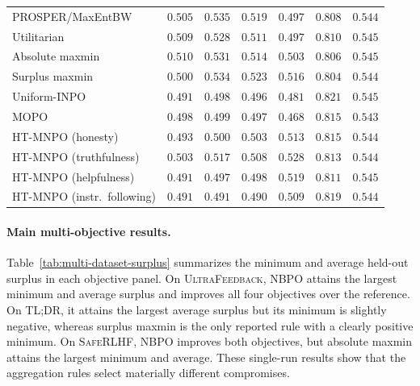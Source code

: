 \documentclass{article}
\theoremstyle{remark}
\theoremstyle{plain}
\newcommand{\NBPO}{\textsc{NBPO}}
\begin{document}
\begin{table}[t]
\begin{tabular}{lrrrrrr}
PROSPER/MaxEntBW & $0.505$ & $0.535$ & $0.519$ & $0.497$ & $0.808$ & $0.544$ \\
Utilitarian & $0.509$ & $0.528$ & $0.511$ & $0.497$ & $0.810$ & $0.545$ \\
Absolute maxmin & $0.510$ & $0.531$ & $0.514$ & $0.503$ & $0.806$ & $0.545$ \\
Surplus maxmin & $0.500$ & $0.534$ & $0.523$ & $0.516$ & $0.804$ & $0.544$ \\
Uniform-INPO & $0.491$ & $0.498$ & $0.496$ & $0.481$ & $0.821$ & $0.545$ \\
MOPO & $0.498$ & $0.499$ & $0.497$ & $0.468$ & $0.815$ & $0.543$ \\
HT-MNPO (honesty) & $0.493$ & $0.500$ & $0.503$ & $0.513$ & $0.815$ & $0.544$ \\
HT-MNPO (truthfulness) & $0.503$ & $0.517$ & $0.508$ & $0.528$ & $0.813$ & $0.544$ \\
HT-MNPO (helpfulness) & $0.491$ & $0.497$ & $0.498$ & $0.519$ & $0.811$ & $0.545$ \\
HT-MNPO (instr.\ following) & $0.491$ & $0.491$ & $0.490$ & $0.509$ & $0.819$ & $0.544$ \\
\bottomrule
\end{tabular}
\end{table}



\paragraph{Main multi-objective results.}
Table~\ref{tab:multi-dataset-surplus} summarizes the minimum and average held-out surplus in each objective panel. On \textsc{UltraFeedback}, \NBPO{} attains the largest minimum and average surplus and improves all four objectives over the reference. On \textsc{TL;DR}, it attains the largest average surplus but its minimum is slightly negative, whereas surplus maxmin is the only reported rule with a clearly positive minimum. On \textsc{SafeRLHF}, \NBPO{} improves both objectives, but absolute maxmin attains the largest minimum and average. These single-run results show that the aggregation rules select materially different compromises.
\end{document}
